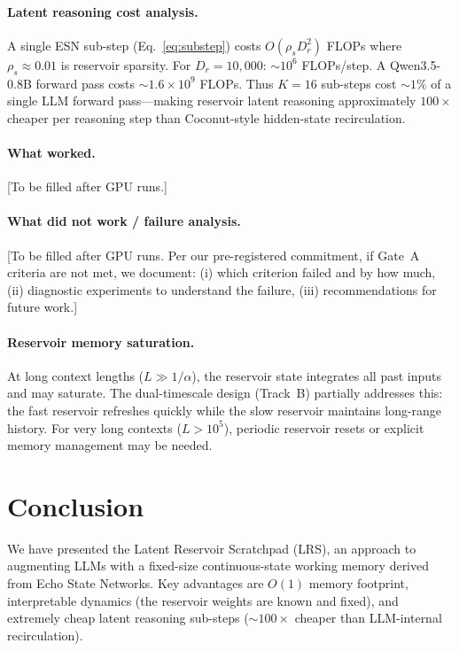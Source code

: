 \documentclass[11pt,a4paper]{article}
\newcommand{\LRS}{\textsc{LRS}}
\theoremstyle{definition}
\begin{document}
\paragraph{Latent reasoning cost analysis.}
A single ESN sub-step (Eq.~\ref{eq:substep}) costs
$O(\rho_s D_r^2)$ FLOPs where $\rho_s \approx 0.01$ is reservoir sparsity.
For $D_r = 10{,}000$: $\sim 10^6$ FLOPs/step.  A Qwen3.5-0.8B forward pass
costs $\sim 1.6 \times 10^9$ FLOPs.  Thus $K=16$ sub-steps cost $\sim 1\%$
of a single LLM forward pass---making reservoir latent reasoning
approximately $100\times$ cheaper per reasoning step than Coconut-style
hidden-state recirculation.

\paragraph{What worked.}
[To be filled after GPU runs.]

\paragraph{What did not work / failure analysis.}
[To be filled after GPU runs.  Per our pre-registered commitment, if Gate~A
criteria are not met, we document: (i) which criterion failed and by how much,
(ii) diagnostic experiments to understand the failure, (iii) recommendations
for future work.]

\paragraph{Reservoir memory saturation.}
At long context lengths ($L \gg 1/\alpha$), the reservoir state integrates all
past inputs and may saturate.  The dual-timescale design (Track~B) partially
addresses this: the fast reservoir refreshes quickly while the slow reservoir
maintains long-range history.  For very long contexts ($L > 10^5$), periodic
reservoir resets or explicit memory management may be needed.

\section{Conclusion}
\label{sec:conclusion}

We have presented the Latent Reservoir Scratchpad (\LRS), an approach to
augmenting LLMs with a fixed-size continuous-state working memory derived from
Echo State Networks.  Key advantages are $O(1)$ memory footprint,
interpretable dynamics (the reservoir weights are known and fixed), and
extremely cheap latent reasoning sub-steps ($\sim 100\times$ cheaper than
LLM-internal recirculation).
\end{document}
